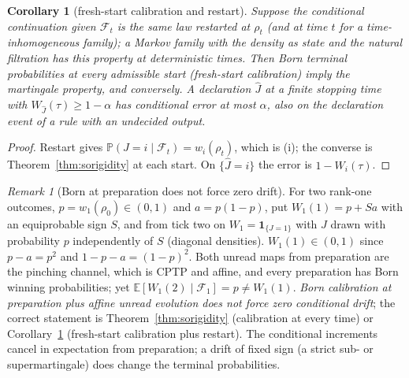 \documentclass[aps,pra,onecolumn,superscriptaddress,nofootinbib,10pt]{revtex4-2}
\newtheorem{corollary}[theorem]{Corollary}
\theoremstyle{definition}
\theoremstyle{remark}
\newtheorem{remark}[theorem]{Remark}
\begin{document}
\begin{corollary}[fresh-start calibration and restart]\label{cor:sorestart}
Suppose the conditional continuation given $\mathcal F_t$ is the same law restarted at $\rho_t$ (and at time $t$ for a
time-inhomogeneous family); a Markov family with the density as state and the natural filtration has this
property at deterministic times.  Then Born terminal probabilities at every admissible start (fresh-start
calibration) imply the martingale property, and conversely.  A declaration $\hat J$ at a finite stopping time
with $W_{\hat J}(\tau)\ge1-\alpha$ has conditional error at most $\alpha$, also on the declaration event of a rule with an
undecided output.
\end{corollary}
\begin{proof}
Restart gives $\mathbb P(J=i\mid\mathcal F_t)=w_i(\rho_t)$, which is (i); the converse is Theorem~\ref{thm:sorigidity} at each start.  On
$\{\hat J=i\}$ the error is $1-W_i(\tau)$.
\end{proof}

\begin{remark}[Born at preparation does not force zero drift]\label{rem:somemory}
For two rank-one outcomes, $p=w_1(\rho_0)\in(0,1)$ and $a=p(1-p)$, put $W_1(1)=p+Sa$ with an equiprobable sign $S$, and from
tick two on $W_1=\mathbf1_{\{J=1\}}$ with $J$ drawn with probability $p$ independently of $S$ (diagonal densities).
$W_1(1)\in(0,1)$ since $p-a=p^2$ and $1-p-a=(1-p)^2$.  Both unread maps from preparation are the pinching channel, which
is CPTP and affine, and every preparation has Born winning probabilities; yet $\mathbb E[W_1(2)\mid\mathcal F_1]=p\ne W_1(1)$.
\emph{Born calibration at preparation plus affine unread evolution does not force zero conditional drift};
the correct statement is Theorem~\ref{thm:sorigidity} (calibration at every time) or Corollary~\ref{cor:sorestart}
(fresh-start calibration plus restart).  The conditional increments cancel in expectation from preparation;
a drift of fixed sign (a strict sub- or supermartingale) does change the terminal probabilities.
\end{remark}
\end{document}
